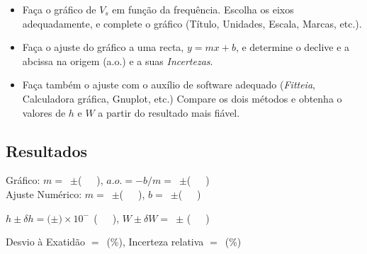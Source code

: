 \documentclass[a4paper,12pt]{article}  %
\def\width{18}
\def\hauteur{11}
\begin{document}
\begin{itemize}
\item  Faça o gráfico de $V_s$ em função da frequência. Escolha os eixos adequadamente, e complete o gráfico (Título, Unidades, Escala, Marcas, etc.). 
\item Faça o ajuste do gráfico a uma recta, $y=mx + b$, e determine o declive e a  abcissa na origem (a.o.) e a suas \emph{Incertezas}.
\item Faça também o ajuste com o auxílio de software adequado (\emph{Fitteia}, Calculadora gráfica, Gnuplot, etc.) 
Compare os dois métodos e obtenha o valores de $h$ e $W$ a partir do resultado mais fiável.  
\end{itemize}



\subsection{\sf Resultados}
\noindent Gráfico:  $m =$~\underline{\makebox[1.5cm][r]{~}}$\pm$\underline{\makebox[1cm][r]{~}}(~~~), 
$a.o.= -b/m=$~\underline{\makebox[1.5cm][r]{~}}$\pm$\underline{\makebox[1cm][r]{~}}(~~~) 
\\
\noindent Ajuste Numérico:  $m=$~\underline{\makebox[1.5cm][r]{~}}$\pm$\underline{\makebox[1cm][r]{~}}(~~~), 
$b=$~\underline{\makebox[1.5cm][r]{~}}$\pm$\underline{\makebox[1cm][r]{~}}(~~~) 

\noindent  $h\pm \delta h=($\underline{\makebox[1.5cm][r]{~}}$\pm$\underline{\makebox[1cm][r]{~}}$)\times 10^{-\,}$ \underline{\makebox[1cm][r]{~}}(~~~), 
$W \pm \delta W=$~\underline{\makebox[1.5cm][r]{~}}$\pm$\underline{\makebox[1cm][r]{~}} (~~~) 

\noindent  Desvio à Exatidão $=$~\underline{\makebox[1cm][r]{~}}(\%), 
Incerteza relativa $=$~\underline{\makebox[1cm][r]{~}}($\%$) 
\end{document}

